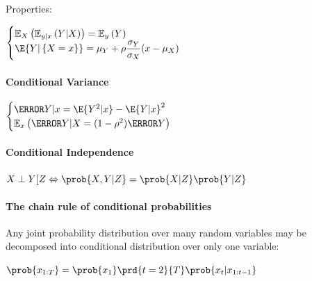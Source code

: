 Properties:
\begin{center}
	$\begin{cases}
        \mathbb{E}_{X}\left(\mathbb{E}_{y|x}\left(Y|X\right)\right)=
        \mathbb{E}_{y}\left(Y\right)\\
	\E{Y|\left\{ X=x \right\}}=\mu_{Y}+\rho\dfrac{\sigma_{Y}}{\sigma_{X}}(x-\mu_{X})
	\end{cases}$	
\end{center}


\paragraph{Conditional Variance}
\begin{center}
	$\begin{cases}
	\V{Y|x}=\E{Y^{2}|x}-\E{Y|x}^{2}\\
	\mathbb{E}_{x}\left( \V{Y|X}=(1-\rho^{2})\V{Y} \right)
	\end{cases}$
\end{center}


\paragraph{Conditional Independence}
$X\perp Y[Z \Leftrightarrow \prob{X,Y|Z}=\prob{X|Z}\prob{Y|Z}$

\paragraph{The chain rule of conditional probabilities}
Any joint probability distribution over many random variables may be decomposed into conditional
distribution over only one variable:
\begin{center}
    $\prob{x_{1:T}} = \prob{x_{1}}\prd{t=2}{T}\prob{x_{t}|x_{1:t-1}}$
\end{center}


